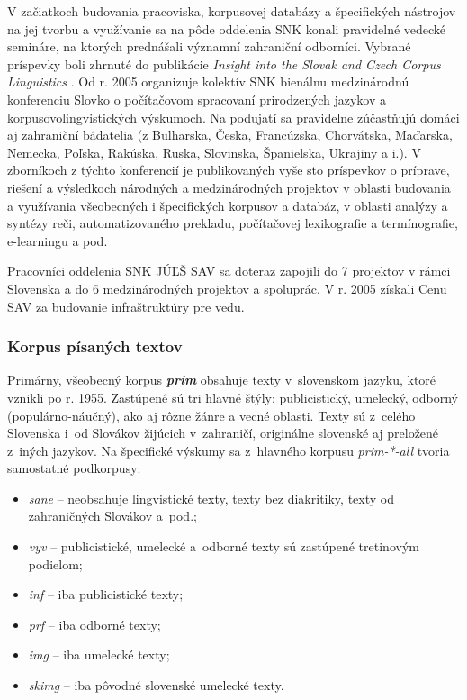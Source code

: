\begin{multicols}{2}
V začiatkoch budovania pracoviska, korpusovej databázy a
špecifických nástrojov na jej tvorbu a využívanie sa na pôde
oddelenia SNK konali pravidelné vedecké semináre, na ktorých
prednášali významní zahraniční odborníci. Vybrané príspevky
boli zhrnuté do publikácie \emph{Insight into the Slovak and Czech Corpus Linguistics} \cite{simkova2006a}. Od r. 2005 organizuje kolektív SNK bienálnu medzinárodnú konferenciu
Slovko\cite{f10} o
počítačovom spracovaní prirodzených jazykov a
korpusovolingvistických výskumoch. Na podujatí sa pravidelne
zúčastňujú domáci aj zahraniční bádatelia (z Bulharska, Česka,
Francúzska, Chorvátska, Maďarska, Nemecka, Poľska, Rakúska, Ruska,
Slovinska, Španielska, Ukrajiny a i.). V zborníkoch z týchto
konferencií je publikovaných vyše sto príspevkov o príprave,
riešení a výsledkoch národných a medzinárodných projektov v
oblasti budovania a využívania všeobecných i špecifických korpusov
a databáz, v oblasti analýzy a syntézy reči, automatizovaného
prekladu, počítačovej lexikografie a termínografie, e-learningu a
pod. 

Pracovníci oddelenia SNK JÚĽŠ SAV sa doteraz zapojili do 7
projektov v rámci Slovenska a do 6 medzinárodných projektov a
spoluprác\cite{f11}. V r. 2005
získali Cenu SAV za budovanie infraštruktúry pre vedu. 

\subsubsection{Korpus písaných textov}
Primárny, všeobecný korpus {\bf\emph{prim}} obsahuje texty
v slovenskom jazyku, ktoré vznikli po r. 1955.  Zastúpené sú tri
hlavné štýly: publicistický, umelecký, odborný
(populárno-náučný), ako aj rôzne žánre a vecné oblasti. Texty
sú z celého Slovenska i od Slovákov žijúcich v zahraničí,
originálne slovenské aj preložené z iných jazykov. Na špecifické
výskumy sa z hlavného korpusu \emph{prim-*-all} tvoria samostatné
podkorpusy:

\begin{itemize}
\item \emph{sane} – neobsahuje lingvistické texty, texty bez diakritiky, texty od zahraničných Slovákov a pod.;
\item \emph{vyv} – publicistické, umelecké a odborné texty sú zastúpené tretinovým podielom;
\item \emph{inf} – iba publicistické texty;
\item \emph{prf} – iba odborné texty;
\item \emph{img} – iba umelecké texty;
\item \emph{skimg} – iba pôvodné slovenské umelecké texty.
\end{itemize}


\end{multicols}
